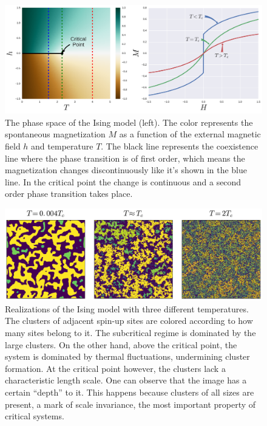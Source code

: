 \begin{figure}
\begin{center}
    \includegraphics[width=\textwidth]{chapters/ch2-crit/figs/ising_phase2}
\end{center}
\caption{The phase space of the Ising model (left). The color represents the
    spontaneous magnetization $M$ as a function of the external magnetic field
    $h$ and temperature $T$. The black line represents the coexistence line
    where the phase transition is of first order, which means the magnetization
    changes discontinuously like it's shown in the blue line. In the critical
    point the change is continuous and a second order phase transition takes
    place.}
\label{fig:ising_phase2}
\end{figure}


\begin{figure}
\begin{center}
    \includegraphics[width=\textwidth]{chapters/ch2-crit/figs/ising}
\end{center}
\caption{Realizations of the Ising model with three different
    temperatures. The clusters of adjacent spin-up sites are colored according
    to how many sites belong to it. The subcritical regime is dominated by the
    large clusters. On the other hand, above the critical point, the system is
    dominated by thermal fluctuations, undermining cluster formation. At the
    critical point however, the clusters lack a characteristic length scale.
    One can observe that the image has a certain ``depth'' to it. This happens
    because clusters of all sizes are present, a mark of scale invariance,
    the most important property of critical systems.}
\label{fig:ising}
\end{figure}

